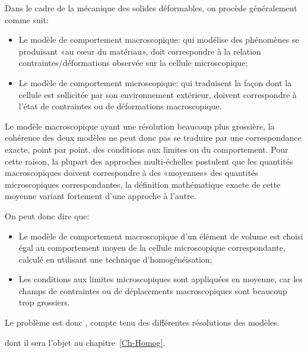 \medskipvm
Dans le cadre de la mécanique des solides déformables, on procède généralement comme suit:
\begin{itemize}
  \item Le modèle de comportement macroscopique: qui modélise des phénomènes se produisant «au cœur du matériau», doit correspondre à la relation contraintes/déformations observée sur la cellule microscopique;

  \item Le modèle de comportement microscopique: qui traduisent la façon dont la cellule est sollicitée par son environnement extérieur, doivent correspondre à l'état de contraintes ou de déformations macroscopique.
\end{itemize}

Le modèle macroscopique ayant une résolution beaucoup plus grossière, la cohérence des deux modèles ne peut donc pas se traduire par une correspondance exacte, point par point, des conditions aux limites ou du comportement. Pour cette raison, la plupart des approches multi-échelles postulent que les quantités macroscopiques doivent correspondre à des «moyennes» des quantités microscopiques correspondantes, la définition mathématique exacte de cette moyenne variant fortement d'une approche à l'autre.

\medskip
{} On peut donc dire que:
\begin{itemize}
  \item Le modèle de comportement macroscopique d'un élément de volume est choisi égal au comportement moyen de la cellule microscopique correspondante, calculé en utilisant une technique d'homogénéisation;

  \item Les conditions aux limites microscopiques sont appliquées en moyenne, car les champs de contraintes ou de déplacements macroscopiques sont beaucoup trop grossiers.
\end{itemize}

\medskip
Le problème est donc , compte tenu des différentes résolutions des modèles.

\medskip
{}  dont il sera l'objet au chapitre~\ref{Ch-Homog}.

\medskip
{}

